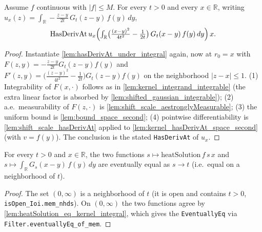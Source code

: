 \begin{lemma}
    \label{lem:hasDerivAt_space_second}
    \leanok
    Assume $f$ continuous with $\lvert f\rvert \le M$. For every $t > 0$ and every
    $x \in \mathbb{R}$, writing $u_x(z) = \int_{\mathbb{R}} -\tfrac{z-y}{2t}\,G_t(z-y)\,f(y)\,dy$,
    \[ \mathrm{HasDerivAt}\,u_x
       \Bigl(\textstyle\int_{\mathbb{R}} \bigl(\tfrac{(x-y)^2}{4t^2}-\tfrac{1}{2t}\bigr)\,
       G_t(x-y)\,f(y)\,dy\Bigr)\, x. \]
\end{lemma}
\begin{proof}
    Instantiate \cref{lem:hasDerivAt_under_integral} again, now at $r_0 = x$ with
    $F(z,y) = -\tfrac{z-y}{2t} G_t(z-y) f(y)$ and
    $F'(z,y) = \bigl(\tfrac{(z-y)^2}{4t^2}-\tfrac{1}{2t}\bigr) G_t(z-y) f(y)$ on the
    neighborhood $\lvert z - x\rvert \le 1$. (1) Integrability of $F(x,\cdot)$ follows as
    in \cref{lem:kernel_integrand_integrable} (the extra linear factor is absorbed by
    \cref{lem:shifted_gaussian_integrable}); (2) a.e.\ measurability of $F(z,\cdot)$ is
    \cref{lem:shift_scale_aestronglyMeasurable}; (3) the uniform bound is
    \cref{lem:bound_space_second}; (4) pointwise differentiability is
    \cref{lem:shift_scale_hasDerivAt} applied to
    \cref{lem:kernel_hasDerivAt_space_second} (with $v = f(y)$). The conclusion is the
    stated \texttt{HasDerivAt} of $u_x$.
\end{proof}

\begin{lemma}
    \label{lem:heatSolution_eventuallyEq_kernel_integral}
    \leanok
    For every $t > 0$ and $x \in \mathbb{R}$, the two functions
    $s \mapsto \mathrm{heatSolution}\,f\,s\,x$ and $s \mapsto \int_{\mathbb{R}} G_s(x-y)\,f(y)\,dy$
    are eventually equal as $s \to t$ (i.e.\ equal on a neighborhood of $t$).
\end{lemma}
\begin{proof}
    The set $(0,\infty)$ is a neighborhood of $t$ (it is open and contains $t > 0$,
    \texttt{isOpen\_Ioi.mem\_nhds}). On $(0,\infty)$ the two functions agree by
    \cref{lem:heatSolution_eq_kernel_integral}, which gives the \texttt{EventuallyEq}
    via \texttt{Filter.eventuallyEq\_of\_mem}.
\end{proof}

